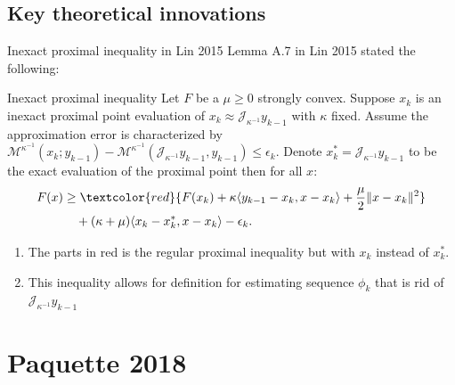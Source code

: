 \documentclass[11pt]{beamer}
\begin{document}
        \subsection{Key theoretical innovations}
            \begin{frame}{Inexact proximal inequality in Lin 2015}
                Lemma A.7 in Lin 2015 \cite{lin_universal_2015} stated the following: 
                \begin{lemma}{Inexact proximal inequality}
                    Let $F$ be a $\mu\ge 0$ strongly convex.
                    Suppose $x_k$ is an inexact proximal point evaluation of $x_k \approx \mathcal J_{\kappa^{-1}} y_{k - 1}$ with $\kappa$ fixed. 
                    Assume the approximation error is characterized by $\mathcal M^{\kappa^{-1}}(x_k; y_{k - 1}) - \mathcal M^{\kappa^{-1}}(\mathcal J_{\kappa^{-1}} y_{k - 1}, y_{k - 1}) \le \epsilon_k$. 
                    Denote $x_k^* = \mathcal J_{\kappa^{-1}} y_{k - 1}$ to be the exact evaluation of the proximal point then for all $x$: 
                        \begin{align*}   
                            F(x) &\ge 
                            \textcolor{red}{
                                F(x_k) + \kappa \langle y_{k - 1} - x_k, x - x_k\rangle
                                + \frac{\mu}{2}\Vert x - x_k\Vert^2 
                            }
                            \\
                            & \quad 
                            + (\kappa + \mu)\langle  x_k - x_k^*, x - x_k\rangle 
                            - \epsilon_k.
                        \end{align*}
                \end{lemma}
                \begin{enumerate}
                    \item The parts in red is the regular proximal inequality but with $x_k$  instead of $x^*_k$. 
                    \item This inequality allows for definition for estimating sequence $\phi_k$ that is rid of $\mathcal J_{\kappa^{-1}}y_{k - 1}$
                \end{enumerate}
            \end{frame}

\section{Paquette 2018}
\end{document}
